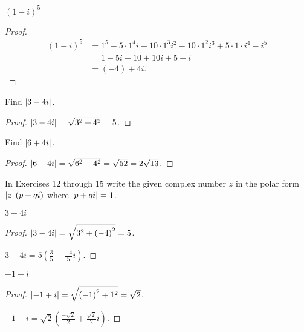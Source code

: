 \begin{exercise}
    ${(1-i)}^{5}$
\end{exercise}

\begin{proof}
    \begin{align*}
        {(1-i)}^{5} & = 1^{5} - 5\cdot 1^{4}i + 10\cdot 1^{3}i^{2} - 10\cdot 1^{2}i^{3} + 5\cdot 1\cdot i^{4} - i^{5} \\
                    & = 1 - 5i - 10 + 10i + 5 - i                                                                     \\
                    & = (-4) + 4i.
    \end{align*}
\end{proof}

\begin{exercise}
    Find $\left\vert{3 - 4i}\right\vert$.
\end{exercise}

\begin{proof}
    $\left\vert{3 - 4i}\right\vert = \sqrt{3^{2} + 4^{2}} = 5$.
\end{proof}

\begin{exercise}
    Find $\left\vert{6 + 4i}\right\vert$.
\end{exercise}

\begin{proof}
    $\left\vert{6 + 4i}\right\vert = \sqrt{6^{2} + 4^{2}} = \sqrt{52} = 2\sqrt{13}$.
\end{proof}

In Exercises 12 through 15 write the given complex number $z$ in the polar form $\left\vert{z}\right\vert(p + qi)$ where $\left\vert{p + qi}\right\vert = 1$.

\begin{exercise}
    $3 - 4i$
\end{exercise}

\begin{proof}
    $\left\vert{3 - 4i}\right\vert = \sqrt{3^{2} + {(-4)}^{2}} = 5$.

    $3 - 4i = 5\left(\frac{3}{5} + \frac{-4}{5}i\right)$.
\end{proof}

\begin{exercise}
    $-1 + i$
\end{exercise}

\begin{proof}
    $\left\vert{-1 + i}\right\vert = \sqrt{{(-1)}^{2} + 1^{2}} = \sqrt{2}$.

    $-1 + i = \sqrt{2}\left(\frac{-\sqrt{2}}{2} + \frac{\sqrt{2}}{2}i\right)$.
\end{proof}

